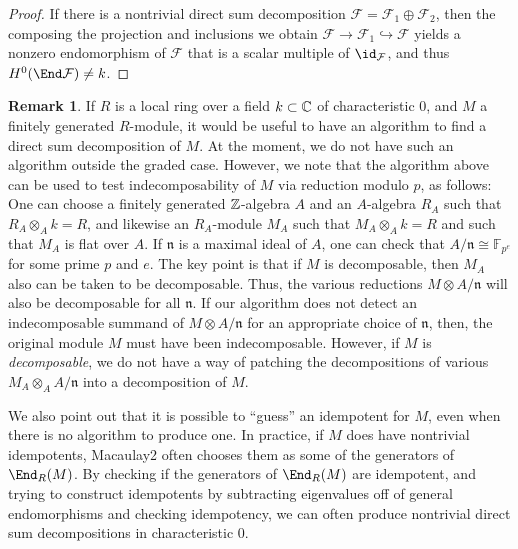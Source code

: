 \documentclass[12pt]{article}
\def\cF{\mathcal F}
\def\FF{\mathbb F}
\let\inc\hookrightarrow
\theoremstyle{theorem}
\numberwithin{thm}{section}
\theoremstyle{definition}
\newtheorem{rem}[thm]{Remark}
\def\n{\mathfrak n}
\begin{document}
\begin{proof}
  If there is a nontrivial direct sum decomposition $\cF = \cF_1\oplus \cF_2$, then the composing the projection and inclusions we obtain $\cF\to \cF_1\inc \cF$ yields a nonzero endomorphism of $\cF$ that is a scalar multiple of $\id_\cF$, and thus $H^0(\End \cF) \neq k$.
\end{proof}

\begin{rem}\label{rem:char}
  If $R$ is a local ring over a field $k\subset \mathbb C$ of characteristic 0, and $M$ a finitely generated $R$-module, it would be useful to have an algorithm to find a direct sum decomposition of $M$.
  At the moment, we do not have such an algorithm outside the graded case.
  However, we note that the algorithm above can be used to test indecomposability of $M$ via reduction modulo $p$, as follows:
  One can choose a finitely generated $\mathbb Z$-algebra $A$ and an $A$-algebra $R_A$ such that $R_A\otimes _A k=R$, and likewise an $R_A$-module $M_A$ such that $M_A\otimes _A k = R$ and such that $M_A$ is flat over $A$. If $\n$ is a maximal ideal of $A$, one can check that $A/\n \cong \FF_{p^e}$ for some prime $p$ and $e$.
  The key point is that if $M$ is decomposable, then $M_A$ also can be taken to be decomposable. Thus, the various reductions  $M\otimes A/\n$ will also be decomposable for all $\n$.
  If our algorithm does not detect an indecomposable summand of $M\otimes A/\n$ for an appropriate choice of $\n$, then, the original module $M$ must have been indecomposable.
  However, if $M$ is \emph{decomposable}, we do not have a way of patching the decompositions of various $M_A\otimes_A A/\n$ into a decomposition of $M$.

  We also point out that it is possible to ``guess'' an idempotent for $M$, even when there is no algorithm to produce one. In practice, if $M$ does have nontrivial idempotents, Macaulay2 often chooses them as some of the generators of $\End_R(M)$. By checking if the generators of $\End_R(M)$ are idempotent, and trying to construct idempotents by subtracting eigenvalues off of general endomorphisms and checking idempotency, we can often produce nontrivial direct sum decompositions in characteristic 0.
\end{rem}
\end{document}
